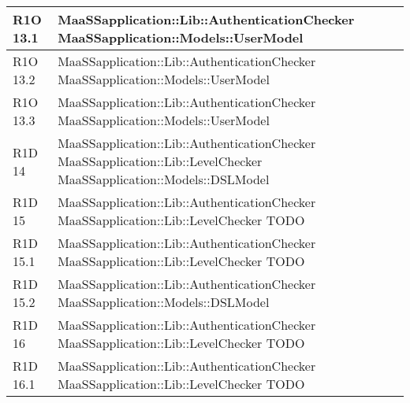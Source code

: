 \begin{center}
\begin{longtable}{ | l | p{8cm} |}
	R1O 13.1 & MaaSSapplication::Lib::AuthenticationChecker \newline MaaSSapplication::Models::UserModel  \newline  \\ \hline
	
	R1O 13.2 & MaaSSapplication::Lib::AuthenticationChecker \newline MaaSSapplication::Models::UserModel  \newline  \\ \hline
	
	R1O 13.3 & MaaSSapplication::Lib::AuthenticationChecker \newline MaaSSapplication::Models::UserModel  \\ \hline


    R1D 14 & MaaSSapplication::Lib::AuthenticationChecker \newline MaaSSapplication::Lib::LevelChecker \newline  MaaSSapplication::Models::DSLModel \newline \\ \hline
    
    R1D 15 & MaaSSapplication::Lib::AuthenticationChecker \newline MaaSSapplication::Lib::LevelChecker \newline   TODO \newline \\ \hline
    
    R1D 15.1 & MaaSSapplication::Lib::AuthenticationChecker \newline MaaSSapplication::Lib::LevelChecker \newline  TODO \newline \\ \hline
    
    R1D 15.2 & MaaSSapplication::Lib::AuthenticationChecker \newline  MaaSSapplication::Models::DSLModel \\ \hline
    
    R1D 16 & MaaSSapplication::Lib::AuthenticationChecker \newline MaaSSapplication::Lib::LevelChecker \newline  TODO \\ \hline

    R1D 16.1 & MaaSSapplication::Lib::AuthenticationChecker \newline MaaSSapplication::Lib::LevelChecker \newline  TODO \\ \hline
    

\end{longtable}
\end{center}
